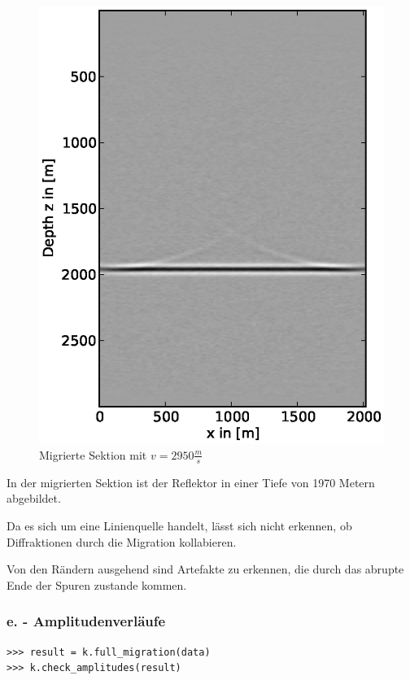 \documentclass[12pt,a4paper]{scrartcl}
\begin{document}
\begin{figure}[htb]
\centering
\includegraphics[width=1\textwidth]{full_migration}
\caption{Migrierte Sektion mit $v = 2950\frac{m}{s}$}
\label{full_migration}
\end{figure}

In der migrierten Sektion ist der Reflektor in einer Tiefe von 1970 Metern abgebildet.

Da es sich um eine Linienquelle handelt, lässt sich nicht erkennen, ob Diffraktionen durch die Migration kollabieren. 

Von den Rändern ausgehend sind Artefakte zu erkennen, die durch das abrupte Ende der Spuren zustande kommen.

\clearpage
\subsubsection*{e. - Amplitudenverläufe}

\begin{verbatim}
>>> result = k.full_migration(data)
>>> k.check_amplitudes(result)
\end{verbatim}
\end{document}
